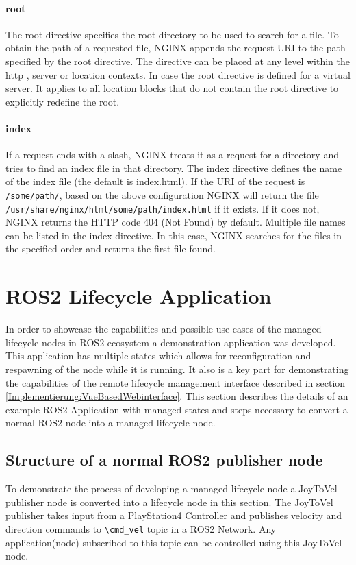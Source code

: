 \paragraph{root} The root directive specifies the root directory to be used to search for a file. To obtain the path of a requested file, NGINX appends the request URI to the path specified by the root directive. The directive can be placed at any level within the http {}, server {} or location {} contexts. In case the root directive is defined for a virtual server. It applies to all location {} blocks that do not contain the root directive to explicitly redefine the root.\cite{nginxCong}

\paragraph{index} If a request ends with a slash, NGINX treats it as a request for a directory and tries to find an index file in that directory. The index directive defines the name of the index file (the default is index.html). If the URI of the request is \lstinline{/some/path/}, based on the above configuration NGINX will return the file \lstinline{/usr/share/nginx/html/some/path/index.html} if it exists. If it does not, NGINX returns the HTTP code 404 (Not Found) by default. Multiple file names can be listed in the index directive. In this case, NGINX searches for the files in the specified order and returns the first file found.


\section{ROS2 Lifecycle Application}
\label{Implementierung:ROS2LifecycleApplication} 
In order to showcase the capabilities and possible use-cases of the managed lifecycle nodes in ROS2 ecosystem a demonstration application was developed. This application has multiple states which allows for reconfiguration and respawning of the node while it is running. It also is a key part for demonstrating the capabilities of the remote lifecycle management interface described in section \ref{Implementierung:VueBasedWebinterface}. This section describes the details of an example ROS2-Application with managed states and steps necessary to convert a normal ROS2-node into a managed lifecycle node. 

\subsection{Structure of a normal ROS2 publisher node}
To demonstrate the process of developing a managed lifecycle node a JoyToVel publisher node is converted into a lifecycle node in this section. The JoyToVel publisher takes input from a PlayStation4 Controller and publishes velocity and direction commands to \lstinline{\cmd_vel} topic in a ROS2 Network. Any application(node) subscribed to this topic can be controlled using this JoyToVel node.\\

